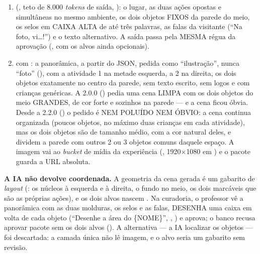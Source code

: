 \begin{enumerate}
  \item {} (, teto de 8.000 \emph{tokens} de
    saída, ): o lugar, as duas ações opostas e simultâneas no
    mesmo ambiente, os dois objetos FIXOS da parede do meio, os selos em CAIXA
    ALTA de até três palavras, as falas da visitante (\enquote{Na foto,
    vi\ldots!}) e o texto alternativo. A saída passa pela MESMA régua da
    aprovação (, com os alvos ainda
    opcionais).
  \item {} com : a panorâmica, a partir
    do JSON, pedida como \enquote{ilustração}, nunca \enquote{foto}
    (), com a atividade 1 na metade esquerda, a 2 na direita, os
    dois objetos exatamente no centro da parede, sem texto escrito, sem logos e
    com crianças genéricas. A 2.0.0 () pedia uma cena LIMPA com
    os dois objetos do meio GRANDES, de cor forte e sozinhos na parede --- e a
    cena ficou óbvia. Desde a 2.2.0 () o pedido é NEM POLUÍDO
    NEM ÓBVIO: a cena continua organizada (poucos objetos, no máximo duas
    crianças em cada atividade), mas os dois objetos são de tamanho médio, com
    a cor natural deles, e dividem a parede com outros 2 ou 3 objetos comuns
    daquele espaço. A imagem vai ao \emph{bucket} de mídia da
    experiência (, 1920$\times$1080
    em ) e o pacote guarda a URL absoluta.
\end{enumerate}

\textbf{A IA não devolve coordenada.} A geometria da cena gerada é um gabarito
de \emph{layout} (: os núcleos à esquerda e à
direita, o fundo no meio, os dois marcáveis que são as próprias ações), e os
dois alvos nascem . Na curadoria, o professor vê a panorâmica com as
duas molduras, os selos e as falas, DESENHA uma caixa em volta de cada objeto
(\enquote{Desenhe a área do \{NOME\}}, ,
) e aprova; o banco recusa aprovar pacote sem os dois alvos
(). A alternativa --- a IA localizar os
objetos --- foi descartada: a camada única não lê imagem, e o alvo seria um
gabarito sem revisão.

